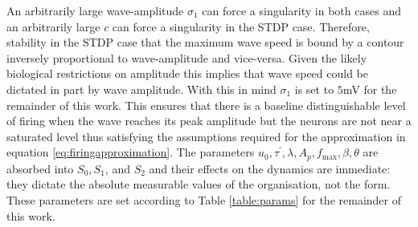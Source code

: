 An arbitrarily large wave-amplitude $\sigma_1$ can force a singularity in both cases and an arbitrarily large $c$ can force a singularity in the STDP case. Therefore, stability in the STDP case that the maximum wave speed is bound by a contour inversely proportional to wave-amplitude and vice-versa. Given the likely biological restrictions on amplitude this implies that wave speed could be dictated in part by wave amplitude. With this in mind $\sigma_1$ is set to $5$mV for the remainder of this work. This ensures that there is a baseline distinguishable level of firing when the wave reaches its peak amplitude but the neurons are not near a saturated level thus satisfying the assumptions required for the approximation in equation \ref{eq:firingapproximation}. The parameters $u_0, \tau^\prime, \lambda, A_p, f_\text{max}, \beta, \theta$ are absorbed into $S_0, S_1$, and $S_2$ and their effects on the dynamics are immediate: they dictate the absolute measurable values of the organisation, not the form. These parameters are set according to Table \ref{table:params} for the remainder of this work.

